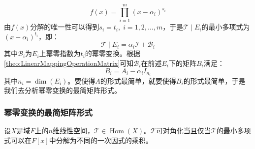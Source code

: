 \begin{equation*}
	f(x)=\prod_{i=1}^{m}(x-\alpha_i)^{s_i}
\end{equation*}
由$f(x)$分解的唯一性可以得到$s_i=t_i,\;i=1,2,\dots,m$，于是$\mathcal{T}\mid E_i$的最小多项式为$(x-\alpha_i)^{t_i}$，即：
\begin{equation*}
	\mathcal{T}\mid E_i=\alpha_i\mathcal{I}+\mathcal{B}_i
\end{equation*}
其中$\mathcal{B}_i$为$E_i$上幂零指数为$t_i$的幂零变换。根据\cref{theo:LinearMappingOperationMatrix}可知$\mathcal{B}_i$在前述$E_i$下的矩阵$B_i$满足：
\begin{equation*}
	B_i=A_i-\alpha_iI_{n_i}
\end{equation*}
其中$n_i=\dim(E_i)$。要使得$A$的形式最简单，就要使得$B_i$的形式最简单，于是我们去分析幂零变换的最简矩阵形式。
\subsubsection{幂零变换的最简矩阵形式}
\begin{theorem}\label{theo:LinearTransformationDiagonal2}
	设$X$是域$F$上的$n$维线性空间，$\mathcal{T}\in\operatorname{Hom}(X)$。$\mathcal{T}$可对角化当且仅当$\mathcal{T}$的最小多项式可以在$F[x]$中分解为不同的一次因式的乘积。
\end{theorem}

